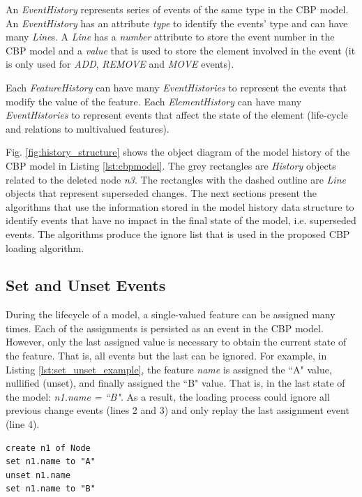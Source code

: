 \documentclass[12pt, a4paper]{report} \usepackage[titletoc]{appendix}
\begin{document}
An \emph{EventHistory} represents series of events of the same type in the CBP model. An \emph{EventHistory} has an attribute \emph{type} to identify the events' type and can have many \emph{Line}s. A \emph{Line} has a \emph{number} attribute to store the event number in the CBP model and a \emph{value} that is used to store the element involved in the event (it is only used for \emph{ADD}, \emph{REMOVE} and \emph{MOVE} events).

Each \emph{FeatureHistory} can have many \emph{EventHistories} to represent the events that modify the value of the feature. Each \emph{ElementHistory} can have many \emph{EventHistories} to represent events that affect the state of the element (life-cycle and relations to multivalued features).

Fig. \ref{fig:history_structure} shows the object diagram of the model history of the CBP model in Listing \ref{lst:cbpmodel}. The grey rectangles are \emph{History} objects related to the deleted node \emph{n3}. The rectangles with the dashed outline are \emph{Line} objects that represent superseded changes. The next sections present the algorithms that use the information stored in the model history data structure to identify events that have no impact in the final state of the model, i.e. superseded events. The algorithms produce the ignore list that is used in the proposed CBP loading algorithm.

\subsection{Set and Unset Events}
\label{subsec:set_and_unset_events}
During the lifecycle of a model, a single-valued feature can be assigned many times. Each of the assignments is persisted as an event in the CBP model. However, only the last assigned value is necessary to obtain the current state of the feature.  That is, all events but the last can be ignored. For example, in Listing \ref{lst:set_unset_example}, the feature \emph{name} is assigned the ``A" value, nullified (unset), and finally assigned the ``B" value. That is, in the last state of the model: \emph{n1.name = ``B"}. As a result, the loading process could ignore all previous change events (lines 2 and 3) and only replay the last assignment event (line 4). 

\begin{lstlisting}[style=eol,caption={The CBP representation of attribute \emph{name} assignments.},label=lst:set_unset_example]
create n1 of Node
set n1.name to "A"
unset n1.name
set n1.name to "B"
\end{lstlisting}
\end{document}
